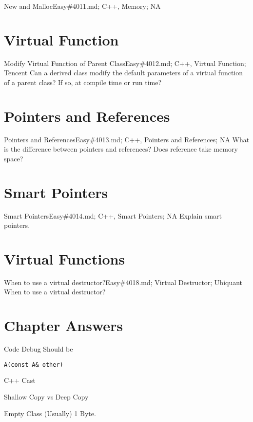 \documentclass[oldfontcommands]{memoir}
\begin{document}
{\begin{question}{New and Malloc}{Easy}{\#4011.md; C++, Memory; NA}
\end{question}

\section{Virtual Function}
\begin{question}{Modify Virtual Function of Parent Class}{Easy}{\#4012.md; C++, Virtual Function; Tencent}
Can a derived class modify the default parameters of a virtual function of a parent class? If so, at compile time or run time?

\end{question}

\section{Pointers and References}
\begin{question}{Pointers and References}{Easy}{\#4013.md; C++, Pointers and References; NA}
What is the difference between pointers and references? Does reference take memory space?

\end{question}

\section{Smart Pointers}
\begin{question}{Smart Pointers}{Easy}{\#4014.md; C++, Smart Pointers; NA}
Explain smart pointers.

\end{question}

\section{Virtual Functions}
\begin{question}{When to use a virtual destructor?}{Easy}{\#4018.md; Virtual Destructor; Ubiquant}
When to use a virtual destructor?

\end{question}

\newpage\section{Chapter Answers}\begin{answer}{Code Debug}
Should be
\begin{verbatim}
A(const A& other)
\end{verbatim}
\end{answer}
\begin{answer}{C++ Cast}
\end{answer}
\begin{answer}{Shallow Copy vs Deep Copy}
\end{answer}
\begin{answer}{Empty Class}
(Usually) 1 Byte.


\end{answer}}
\end{document}
